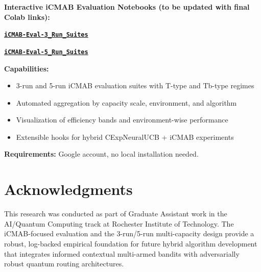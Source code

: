 \documentclass[12pt,a4paper]{article}
\newcommand{\colab}[1]{\textcolor{colabcolor}{\textbf{#1}}}
\begin{document}
\begin{tcolorbox}[colback=colabcolor!20,colframe=colabcolor,title=\textbf{Interactive Framework Access (Placeholder Links)}]

\begin{center}
\textbf{Interactive iCMAB Evaluation Notebooks (to be updated with final Colab links):}
\vspace{0.3cm}

\href{https://colab.research.google.com/drive/PLACEHOLDER_3_RUNS}{\colab{\texttt{iCMAB-Eval-3\_Run\_Suites}}}

\href{https://colab.research.google.com/drive/PLACEHOLDER_5_RUNS}{\colab{\texttt{iCMAB-Eval-5\_Run\_Suites}}}

\vspace{0.3cm}
\textbf{Capabilities:}
\begin{itemize}
\item 3-run and 5-run iCMAB evaluation suites with T-type and Tb-type regimes
\item Automated aggregation by capacity scale, environment, and algorithm
\item Visualization of efficiency bands and environment-wise performance
\item Extensible hooks for hybrid CExpNeuralUCB + iCMAB experiments
\end{itemize}

\textbf{Requirements:} Google account, no local installation needed.
\end{center}
\end{tcolorbox}

\section{Acknowledgments}

This research was conducted as part of Graduate Assistant work in the AI/Quantum Computing track at Rochester Institute of Technology. The iCMAB-focused evaluation and the 3-run/5-run multi-capacity design provide a robust, log-backed empirical foundation for future hybrid algorithm development that integrates informed contextual multi-armed bandits with adversarially robust quantum routing architectures.
\end{document}
